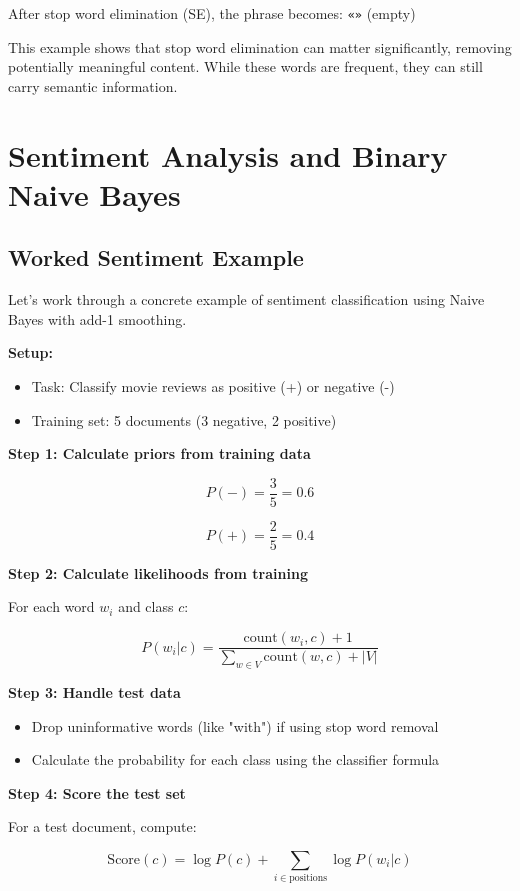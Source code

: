 \documentclass[11pt,a4paper]{article}
\theoremstyle{definition}
\theoremstyle{plain}
\theoremstyle{remark}
\begin{document}
After stop word elimination (SE), the phrase becomes: \texttt{«»} (empty)

This example shows that stop word elimination can matter significantly, removing potentially meaningful content. While these words are frequent, they can still carry semantic information.

\section{Sentiment Analysis and Binary Naive Bayes}

\subsection{Worked Sentiment Example}

Let's work through a concrete example of sentiment classification using Naive Bayes with add-1 smoothing.

\textbf{Setup:}
\begin{itemize}
    \item Task: Classify movie reviews as positive (+) or negative (-)
    \item Training set: 5 documents (3 negative, 2 positive)
\end{itemize}

\textbf{Step 1: Calculate priors from training data}

\[
P(-) = \frac{3}{5} = 0.6
\]

\[
P(+) = \frac{2}{5} = 0.4
\]

\textbf{Step 2: Calculate likelihoods from training}

For each word $w_i$ and class $c$:

\[
P(w_i | c) = \frac{\text{count}(w_i, c) + 1}{\sum_{w \in V} \text{count}(w, c) + |V|}
\]

\textbf{Step 3: Handle test data}

\begin{itemize}
    \item Drop uninformative words (like "with") if using stop word removal
    \item Calculate the probability for each class using the classifier formula
\end{itemize}

\textbf{Step 4: Score the test set}

For a test document, compute:

\[
\text{Score}(c) = \log P(c) + \sum_{i \in \text{positions}} \log P(w_i | c)
\]
\end{document}

